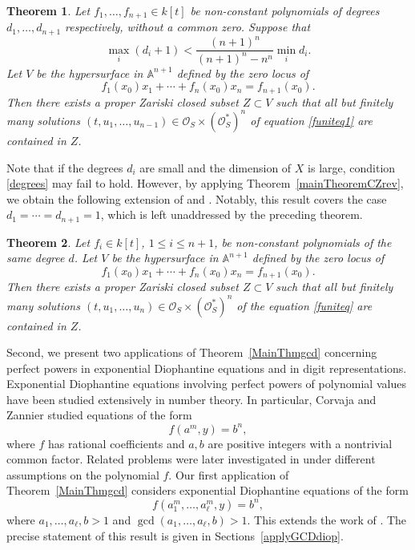 \documentclass[10pt]{amsart}
\numberwithin{equation}{section}
\theoremstyle{plain}
\newtheorem{theorem}{Theorem}[section]
\theoremstyle{definition}
\begin{document}
\begin{theorem}\label{unit1}
    Let $f_1,\ldots,f_{n+1} \in k[t]$ be non-constant polynomials of degrees $d_1,\ldots,d_{n+1}$ respectively,  without a common zero. Suppose that 
    \begin{equation}\label{degrees}
     \max_i (d_i+1) <   \frac{(n+1)^n}{(n+1)^n-n^n} \min_i d_i.
    \end{equation}
    Let  $V$  be the hypersurface  in $\mathbb A^{n+1}$ defined by the zero locus of  
   \begin{equation}\label{funiteq1}
        f_1(x_0)x_1 + \cdots + f_n(x_0)x_n=f_{n+1}(x_0).
    \end{equation} 
  Then there exists a proper Zariski closed subset $Z\subset V$    such that all but finitely many solutions $(t,u_1,\hdots,u_{n-1})\in \mathcal O_S\times  (\mathcal O_S^*)^n$ of  equation  \eqref{funiteq1}
are contained in $Z$.  
 \end{theorem}
Note that if the degrees $d_i$ are small and the dimension of $X$ is large, condition \eqref{degrees}  may fail to hold. However, by applying Theorem~\ref{mainTheoremCZrev}, we obtain the following extension of \cite[Theorem 4.1]{CZ2006} and \cite[Theorem 8]{CZ2010}. Notably, this result covers the case $d_1=\cdots=d_{n+1}=1$, which is left unaddressed by the preceding theorem.

\begin{theorem}\label{unit2}
Let $f_i\in k[t]$, $1\le i\le n+1$, be non-constant polynomials of the same degree $d$.
Let  $V$  be the hypersurface  in $\mathbb A^{n+1}$ defined by the zero locus of  
   \begin{equation}\label{funiteq}
        f_1(x_0)x_1 + \cdots + f_n(x_0)x_n=f_{n+1}(x_0).
    \end{equation} 
  Then there exists a proper Zariski closed subset $Z\subset V$    such that all but finitely many solutions $(t,u_1,\hdots,u_{n})\in \mathcal O_S\times  (\mathcal O_S^*)^n$ of the equation  \eqref{funiteq}
are contained in $Z$.  
 \end{theorem}

Second, we present two applications of Theorem~\ref{MainThmgcd} concerning perfect powers in exponential Diophantine equations and in digit representations. Exponential Diophantine equations involving perfect powers of polynomial values have been studied extensively in number theory. In particular, Corvaja and Zannier \cite{CZ00} studied equations of the form
\[
f(a^m,y)=b^n,
\]
where $f$ has rational coefficients and $a,b$ are positive integers with a nontrivial common factor. Related problems were later investigated in \cite{HLX} under different assumptions on the polynomial $f$.
Our first application of Theorem~\ref{MainThmgcd} considers exponential Diophantine equations of the form
\[
f(a_1^{m},\ldots,a_{\ell}^{m},y)=b^n,
\]
where $a_1,\ldots,a_{\ell},b>1$ and $\gcd(a_1,\ldots,a_{\ell},b) > 1$.   This extends the work of \cite{HLX}.
The precise statement of this result is given in Sections~\ref{applyGCDdiop}.
 
\end{document}
